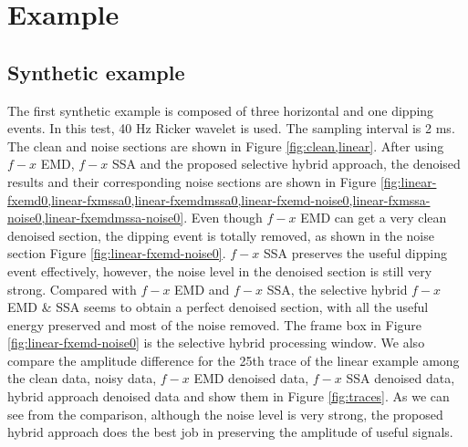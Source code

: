 \section{Example}
\subsection{Synthetic example}
The first synthetic example is composed of three horizontal and one dipping events. In this test, 40 Hz Ricker wavelet is used. The sampling interval is 2 ms. The clean and noise sections are shown in Figure \ref{fig:clean,linear}. After using $f-x$ EMD, $f-x$ SSA and the proposed selective hybrid approach, the denoised results and their corresponding noise sections are shown in Figure \ref{fig:linear-fxemd0,linear-fxmssa0,linear-fxemdmssa0,linear-fxemd-noise0,linear-fxmssa-noise0,linear-fxemdmssa-noise0}. Even though $f-x$ EMD can get a very clean denoised section, the dipping event is totally removed, as shown in the noise section Figure \ref{fig:linear-fxemd-noise0}. $f-x$ SSA preserves the useful dipping event effectively, however, the noise level in the denoised section is still very strong. Compared with $f-x$ EMD and $f-x$ SSA, the selective hybrid $f-x$ EMD \& SSA seems to obtain a perfect denoised section, with all the useful energy preserved and most of the noise removed. The frame box in Figure \ref{fig:linear-fxemd-noise0} is the selective hybrid processing window. We also compare the amplitude difference for the 25th trace of the linear example among the clean data, noisy data, $f-x$ EMD denoised data, $f-x$ SSA denoised data, hybrid approach denoised data and show them in Figure \ref{fig:traces}. As we can see from the comparison, although the noise level is very strong, the proposed hybrid approach does the best job in preserving the amplitude of useful signals.

